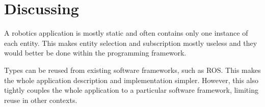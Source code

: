 \section{Discussing}
\label{sec:discussing}

A robotics application is mostly static and often contains only one
instance of each entity. This makes entity selection and subscription
mostly useless and they would better be done within the programming
framework.

Types can be reused from existing software frameworks, such as ROS.
This makes the whole application description and implementation
simpler. However, this also tightly couples the whole application to a
particular software framework, limiting reuse in other contexts.
